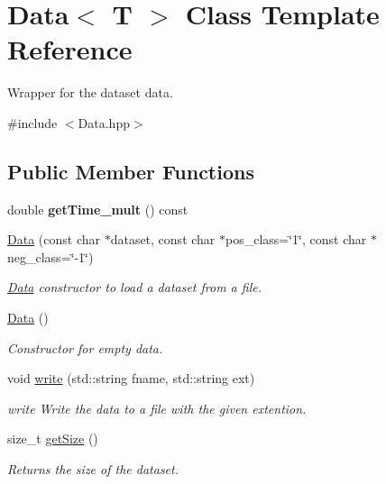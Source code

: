 \hypertarget{class_data}{}\section{Data$<$ T $>$ Class Template Reference}
\label{class_data}


Wrapper for the dataset data.  




{\ttfamily \#include $<$Data.\+hpp$>$}

\subsection*{Public Member Functions}
\begin{DoxyCompactItemize}
\item 
\mbox{\label{class_data_ab13d49c84377160673c5c38cb15d18ba}} 
double {\bfseries get\+Time\+\_\+mult} () const
\item 
\hyperlink{class_data_a3c777650cc0c7123906cd5ff373d3fd6}{Data} (const char $\ast$dataset, const char $\ast$pos\+\_\+class=\char`\"{}1\char`\"{}, const char $\ast$neg\+\_\+class=\char`\"{}-\/1\char`\"{})
\begin{DoxyCompactList}\small\item\em \hyperlink{class_data}{Data} constructor to load a dataset from a file. \end{DoxyCompactList}\item 
\hyperlink{class_data_ab37beb31b788e0c806211af241b86bba}{Data} ()
\begin{DoxyCompactList}\small\item\em Constructor for empty data. \end{DoxyCompactList}\item 
void \hyperlink{class_data_a1f0bf8cc73e43cd6915289706abc46b2}{write} (std\+::string fname, std\+::string ext)
\begin{DoxyCompactList}\small\item\em write Write the data to a file with the given extention. \end{DoxyCompactList}\item 
size\+\_\+t \hyperlink{class_data_a310d4da4294cb3576a2faf0809c91b1e}{get\+Size} ()
\begin{DoxyCompactList}\small\item\em Returns the size of the dataset. \end{DoxyCompactList}\item 

\end{DoxyCompactItemize}
